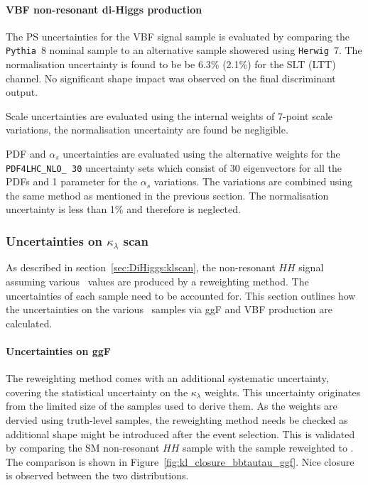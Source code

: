 \paragraph{VBF non-resonant di-Higgs production}
The PS uncertainties for the
VBF signal sample is evaluated by comparing the
\texttt{Pythia}~8 nominal sample to an alternative sample 
showered using \texttt{Herwig}~7.
The normalisation uncertainty is found to be be 6.3\% (2.1\%)
for the SLT (LTT) channel.
No significant shape impact was observed on the final discriminant output.

Scale uncertainties are evaluated using the internal weights 
of 7-point scale variations, the normalisation uncertainty are found be negligible.

PDF and $\alpha_s$ uncertainties are evaluated
using the alternative weights for the \texttt{PDF4LHC\_NLO\_ 30}
uncertainty sets which consist of 30 eigenvectors for
all the PDFs and 1 parameter for the $\alpha_s$ variations.
The variations are combined using the same method as mentioned in 
the previous section. 
The normalisation uncertainty is less than 1\% and therefore is neglected.








\subsubsection{Uncertainties on  \texorpdfstring{$\kappa_\lambda$}{kl} scan}
\label{sec:klscan-systs}
As described in section~\ref{sec:DiHiggs:klscan}, the non-resonant $HH$ signal 
assuming various \kl\ values are produced by a reweighting method. 
The uncertainties of each sample need to be accounted for.
This section outlines how the uncertainties on the various \kl\ samples
via ggF and VBF production are calculated.
\paragraph{Uncertainties on ggF}
The reweighting method comes with an additional systematic uncertainty, 
covering the statistical uncertainty on the $\kappa_\lambda$ weights.
This uncertainty originates from the limited size of the samples used to derive them.
As the weights are dervied using truth-level samples, the reweighting method needs be checked
as additional shape might be introduced after the event selection.  
This is validated by comparing the SM non-resonant $HH$ sample
with the  sample reweighted to . 
The comparison is shown in Figure~\ref{fig:kl_closure_bbtautau_ggf}.
Nice closure is observed between the two distributions. 

